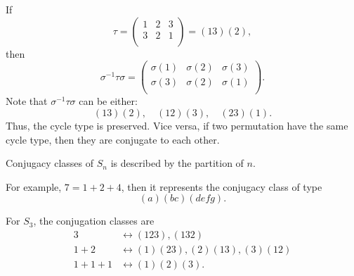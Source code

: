 \begin{eg}
    If 
    \[
        \tau = \begin{pmatrix}
            1 & 2 & 3  \\
            3 & 2 & 1  \\
        \end{pmatrix} = (13)(2),
    \] then 
    \[
        \sigma ^{-1} \tau \sigma = \begin{pmatrix}
            \sigma (1) & \sigma (2) & \sigma (3)  \\
            \sigma (3) & \sigma (2) & \sigma (1)  \\
        \end{pmatrix}.
    \]
    Note that \(\sigma ^{-1} \tau \sigma \) can be either:
    \[
        (13)(2), \quad (12)(3), \quad (23)(1).
    \] Thus, the cycle type is preserved. Vice versa, if two permutation have the same cycle type, then they are conjugate to each other.
\end{eg}

\begin{theorem}
    Conjugacy classes of \(S_n\) is described by the partition of \(n\).  
\end{theorem}

For example, \(7 = 1 + 2 + 4\), then it represents the conjugacy class of type 
\[
    (a)(bc)(defg).
\] 
\begin{eg}
    For \(S_3\), the conjugation classes are 
    \begin{align*}
        3 &\leftrightarrow (123), (132) \\
        1 + 2 &\leftrightarrow (1)(23), (2)(13), (3)(12) \\
        1+1+1 &\leftrightarrow (1)(2)(3).
    \end{align*} 
\end{eg}
